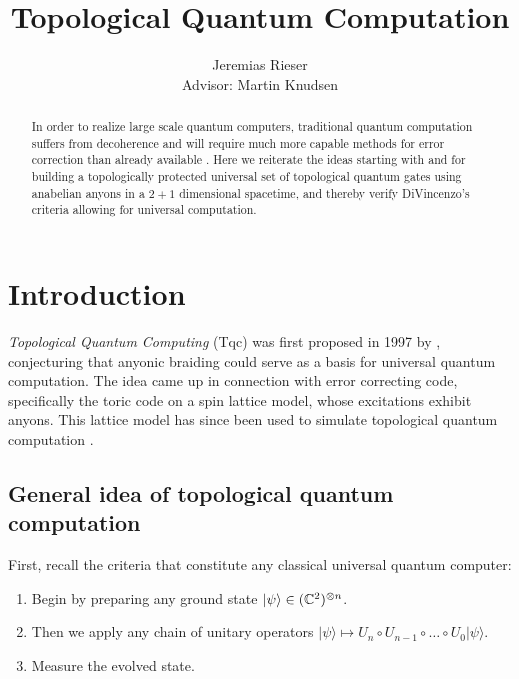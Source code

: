 \documentclass{article}
\begin{document}
\title{Topological Quantum Computation}

\author{Jeremias Rieser \\
Advisor: Martin Knudsen}

\maketitle

\begin{abstract}
  In order to realize large scale quantum computers, traditional quantum computation suffers from decoherence and will require much more capable methods for error correction than already available \cite{sau_roadmap_2017}. Here we reiterate the ideas starting with \cite{kitaev_fault-tolerant_1997} and \cite{freedman_topological_2002} for building a topologically protected universal set of topological quantum gates using anabelian anyons in a $2 + 1$ dimensional spacetime, and thereby verify DiVincenzo's criteria allowing for universal computation.
\end{abstract}
\medskip


\section{Introduction}

{\it Topological Quantum Computing} (Tqc) was first proposed in 1997 by \cite{kitaev_fault-tolerant_1997}, conjecturing that anyonic braiding could serve as a basis for universal quantum computation. The idea came up in connection with error correcting code, specifically the toric code on a spin lattice model, whose excitations exhibit anyons. This lattice model has since been used to simulate topological quantum computation \cite{satzinger_realizing_2021}.

\subsection{General idea of topological quantum computation}

First, recall the criteria that constitute any classical universal quantum computer:

\begin{enumerate}
  \item Begin by preparing any ground state $\vert \psi \rangle \in (\mathbb{C}^2)^{\otimes n}$.
  \item Then we apply any chain of unitary operators $ \vert \psi \rangle \mapsto U_n \circ U_{n-1} \circ \ldots \circ U_0 \vert \psi \rangle$.
  \item Measure the evolved state.
\end{enumerate}
\end{document}
